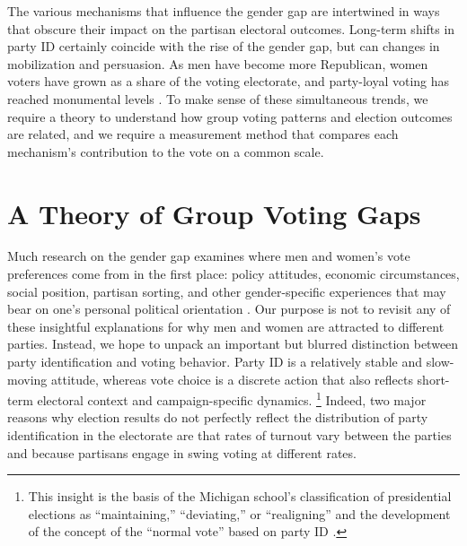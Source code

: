 \documentclass[12pt
               ,final
               ]{article}
\begin{document}
The various mechanisms that influence the gender gap are intertwined in ways that obscure their impact on the partisan electoral outcomes. Long-term shifts in party ID certainly coincide with the rise of the gender gap, but can changes in mobilization and persuasion. As men have become more Republican, women voters have grown as a share of the voting electorate, and party-loyal voting has reached monumental levels \citep{zingher2014analysis,bartels2000partisanship,bafumi2009new}. To make sense of these simultaneous trends, we require a theory to understand how group voting patterns and election outcomes are related, and we require a measurement method that compares each mechanism's contribution to the vote on a common scale. 



\section*{A Theory of Group Voting Gaps}
\label{sec:theory}

Much research on the gender gap examines where men and women's vote preferences come from in the first place: policy attitudes, economic circumstances, social position, partisan sorting, and other gender-specific experiences that may bear on one's personal political orientation \citep{box2004dynamics,chaney1998explaining,conover1988,edlund2002,gillionetal,kaufmann1999changing,manza1998gender}. Our purpose is not to revisit any of these insightful explanations for why men and women are attracted to different parties. Instead, we hope to unpack an important but blurred distinction between party identification and voting behavior. Party ID is a relatively stable and slow-moving attitude, whereas vote choice is a discrete action that also reflects short-term electoral context and campaign-specific dynamics.%
 \footnote{This insight is the basis of the Michigan school's classification of presidential elections as ``maintaining,'' ``deviating,'' or ``realigning'' \citep{campbell1966classification} and the development of the concept of the ``normal vote'' based on party ID \citep{converse1966normalvote,levendusky2008measuring}.}
Indeed, two major reasons why election results do not perfectly reflect the distribution of party identification in the electorate are that rates of turnout vary between the parties and because partisans engage in swing voting at different rates.
\end{document}
